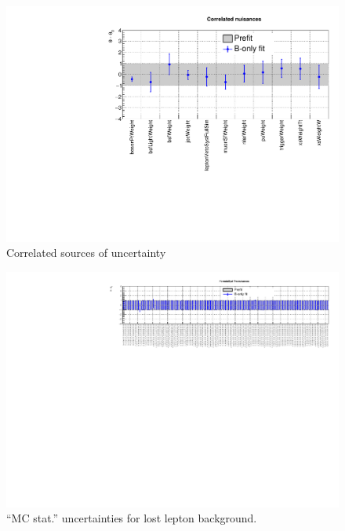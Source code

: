 \begin{figure}[h!]
  \centering
  \caption{Correlated sources of uncertainty}
  \includegraphics[width=1.\linewidth]{figures/results/36invfb_freeze/postfit/nuis/Correlated_nuisances}
\end{figure}

\clearpage
\begin{figure}[h!]
  \centering
  \caption{``MC stat.'' uncertainties for lost lepton background.}
  \includegraphics[width=1.\linewidth]{figures/results/36invfb_freeze/postfit/nuis/FormulaSystTtw_nuisances}
\end{figure}

